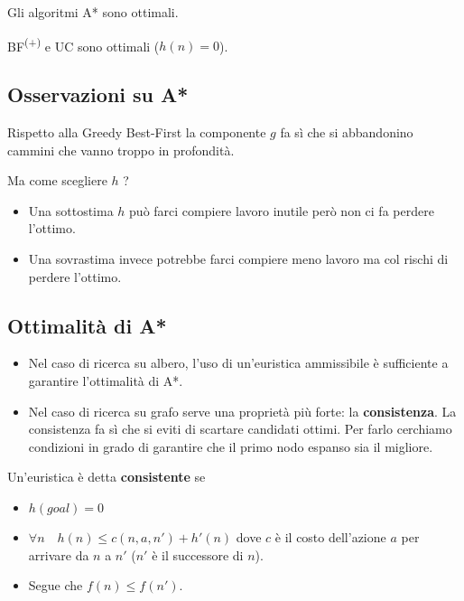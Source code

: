 \begin{theorem}
	Gli algoritmi A* sono ottimali.
\end{theorem}

\begin{corollary}
	BF\textsuperscript{(+)} e UC sono ottimali ($h(n) = 0$).
\end{corollary}

\subsection{Osservazioni su A*}
Rispetto alla Greedy Best-First la componente $g$ fa s\`i che si abbandonino cammini che
vanno troppo in profondit\`a.

Ma come scegliere $h$ ?
\begin{itemize}
	\item Una sottostima $h$ pu\`o farci compiere lavoro inutile per\`o non ci fa perdere
	      l'ottimo.
	\item Una sovrastima invece potrebbe farci compiere meno lavoro ma col rischi di perdere
	      l'ottimo.
\end{itemize}

\subsection{Ottimalit\`a di A*}
\begin{itemize}
	\item Nel caso di ricerca su albero, l'uso di un'euristica ammissibile \`e sufficiente a
	      garantire l'ottimalit\`a di A*.
	\item Nel caso di ricerca su grafo serve una propriet\`a pi\`u forte: la
	      \textbf{consistenza}. La consistenza fa s\`i che si eviti di scartare candidati
	      ottimi. Per farlo cerchiamo condizioni in grado di garantire che il primo nodo
	      espanso sia il migliore.
\end{itemize}

\begin{definition}
	Un'euristica \`e detta \textbf{consistente} se
	\begin{itemize}
		\item $h(goal) = 0$
		\item $\forall n \quad h(n) \leq c(n, a, n') + h'(n)$ dove $c$ \`e il costo dell'azione
		      $a$ per arrivare da $n$ a $n'$ ($n'$ \`e il successore di $n$).
		\item Segue che $f(n) \leq f(n')$.
	\end{itemize}
\end{definition}

